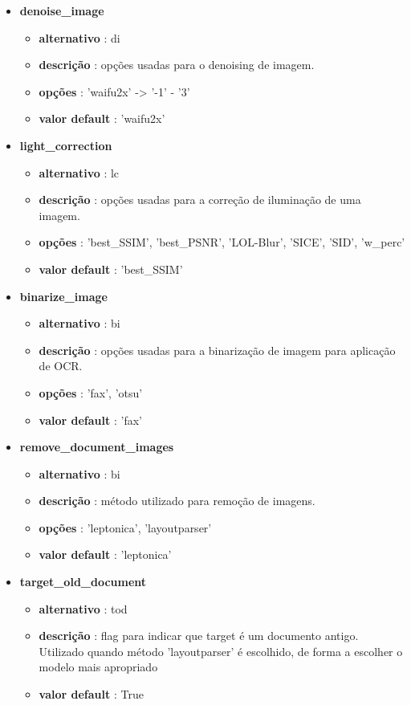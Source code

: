\begin{itemize}
	\item \textbf{denoise\_image}
		\begin{itemize}\setlength\itemsep{-0.5em}
			\item \textbf{alternativo} : di
			\item \textbf{descrição} : opções usadas para o denoising de imagem.
			\item \textbf{opções} : 'waifu2x' -> '-1' - '3'
			\item \textbf{valor default} : 'waifu2x'
		\end{itemize}
	
	\item \textbf{light\_correction}
		\begin{itemize}\setlength\itemsep{-0.5em}
			\item \textbf{alternativo} : lc
			\item \textbf{descrição} : opções usadas para a correção de iluminação de uma imagem.
			\item \textbf{opções} : 'best\_SSIM', 'best\_PSNR', 'LOL-Blur', 'SICE', 'SID', 'w\_perc'
			\item \textbf{valor default} : 'best\_SSIM'
		\end{itemize}
	
	\item \textbf{binarize\_image}
		\begin{itemize}\setlength\itemsep{-0.5em}
			\item \textbf{alternativo} : bi
			\item \textbf{descrição} : opções usadas para a binarização de imagem para aplicação de OCR.
			\item \textbf{opções} : 'fax', 'otsu'
			\item \textbf{valor default} : 'fax'
		\end{itemize}
	
	\item \textbf{remove\_document\_images}
		\begin{itemize}\setlength\itemsep{-0.5em}
			\item \textbf{alternativo} : bi
			\item \textbf{descrição} : método utilizado para remoção de imagens.
			\item \textbf{opções} : 'leptonica', 'layoutparser'
			\item \textbf{valor default} : 'leptonica'
		\end{itemize}
	
	\item \textbf{target\_old\_document}
		\begin{itemize}\setlength\itemsep{-0.5em}
			\item \textbf{alternativo} : tod
			\item \textbf{descrição} : flag para indicar que target é um documento antigo. Utilizado quando método 'layoutparser' é escolhido, de forma a escolher o modelo mais apropriado
			\item \textbf{valor default} : True
		\end{itemize}
	

\end{itemize}
